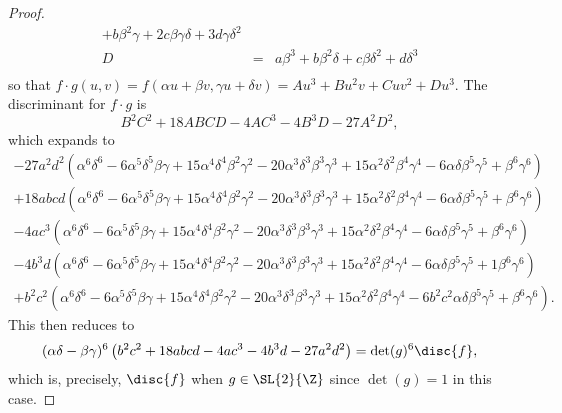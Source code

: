 \documentclass[10pt]{amsart}
\begin{document}
\begin{thm}
\begin{proof}
\begin{eqnarray*}
        + b \beta^{2} \gamma 
        + 2 c \beta \gamma \delta
        + 3 d \gamma \delta^{2}\\
    D &=& a \beta^{3} 
        + b \beta^{2} \delta 
        + c \beta \delta^{2} 
        + d \delta^{3}\\
  \end{eqnarray*}
  so that $f \cdot g(u,v) = f(\alpha u + \beta v, \gamma u + \delta v) = Au^3 + Bu^2v + Cuv^2 + Du^3$.
  The discriminant for $f \cdot g$ is
  $$B^2C^2 + 18ABCD - 4AC^3 - 4B^3D - 27A^2D^2,$$ 
  which expands to
  \begin{eqnarray*}
    - 27 a^{2} d^{2}\left(\alpha^{6} \delta^{6} 
    - 6 \alpha^{5}\delta^{5} \beta\gamma 
    + 15 \alpha^{4}\delta^{4} \beta^{2}\gamma^{2} 
    - 20 \alpha^{3}\delta^{3} \beta^{3}\gamma^{3} 
    + 15 \alpha^{2}\delta^{2} \beta^{4}\gamma^{4} 
    - 6 \alpha\delta \beta^{5}\gamma^{5} 
    + \beta^{6} \gamma^{6}\right)\\
    + 18a b c d \left( \alpha^{6} \delta^{6} 
    - 6 \alpha^{5}\delta^{5} \beta\gamma 
    + 15 \alpha^{4}\delta^{4} \beta^{2}\gamma^{2} 
    - 20 \alpha^{3}\delta^{3} \beta^{3}\gamma^{3} 
    + 15 \alpha^{2}\delta^{2} \beta^{4}\gamma^{4} 
    - 6 \alpha\delta \beta^{5}\gamma^{5} 
    + \beta^{6}\gamma^{6}\right)\\
    - 4 a c^{3} \left( \alpha^{6}\delta^{6} 
    - 6 \alpha^{5}\delta^{5} \beta\gamma 
    + 15 \alpha^{4}\delta^{4} \beta^{2}\gamma^{2} 
    - 20 \alpha^{3}\delta^{3} \beta^{3}\gamma^{3} 
    + 15 \alpha^{2}\delta^{2} \beta^{4}\gamma^{4} 
    - 6 \alpha\delta \beta^{5}\gamma^{5} 
    + \beta^{6}\gamma^{6}\right)\\
    - 4b^{3} d \left(\alpha^{6} \delta^{6} 
    - 6 \alpha^{5}\delta^{5} \beta\gamma 
    + 15 \alpha^{4}\delta^{4} \beta^{2}\gamma^{2} 
    - 20 \alpha^{3}\delta^{3} \beta^{3}\gamma^{3} 
    + 15 \alpha^{2}\delta^{2} \beta^{4}\gamma^{4} 
    - 6 \alpha\delta \beta^{5}\gamma^{5} 
    + 1 \beta^{6}\gamma^{6}\right)\\
    + b^{2} c^{2} \left(\alpha^{6}\delta^{6} 
    - 6 \alpha^{5}\delta^{5} \beta\gamma 
    + 15 \alpha^{4}\delta^{4} \beta^{2}\gamma^{2} 
    - 20 \alpha^{3}\delta^{3} \beta^{3}\gamma^{3} 
    + 15 \alpha^{2}\delta^{2} \beta^{4}\gamma^{4} 
    - 6 b^{2} c^{2}\alpha\delta \beta^{5}\gamma^{5} 
    + \beta^{6} \gamma^{6}\right).
  \end{eqnarray*}
  This then reduces to 
  $$(\alpha\delta - \beta\gamma)^6 \left(b^{2}c^{2} + 18abcd - 4 ac^{3} - 4b^{3}d - 27 a^2 d^2 \right) = \det(g)^6\disc{f},$$
  which is, precisely, $\disc{f}$ when $g \in \SL{2}{\Z}$ since $\det(g) = 1$ in this case.
  \end{proof}
\end{thm}
\end{document}
